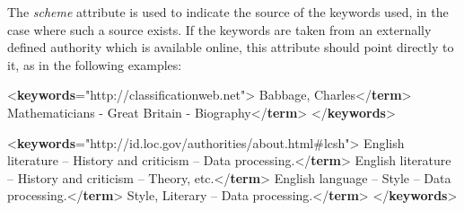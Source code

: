 The {\itshape scheme} attribute is used to indicate the source of the keywords used, in the case where such a source exists. If the keywords are taken from an externally defined authority which is available online, this attribute should point directly to it, as in the following examples: \par\bgroup{}\exampleFont \begin{shaded}\noindent\mbox{}{<\textbf{keywords}\hspace*{1em}{scheme}="{http://classificationweb.net}">}\mbox{}\newline 
{}Babbage, Charles{</\textbf{term}>}\mbox{}\newline 
{}Mathematicians - Great Britain - Biography{</\textbf{term}>}\mbox{}\newline 
{</\textbf{keywords}>}\end{shaded}\egroup\par \noindent  \par\bgroup{}\exampleFont \begin{shaded}\noindent\mbox{}{<\textbf{keywords}\hspace*{1em}{scheme}="{http://id.loc.gov/authorities/about.html\#lcsh}">}\mbox{}\newline 
{}English literature -- History and criticism -- Data processing.{</\textbf{term}>}\mbox{}\newline 
{}English literature -- History and criticism -- Theory, etc.{</\textbf{term}>}\mbox{}\newline 
{}English language -- Style -- Data processing.{</\textbf{term}>}\mbox{}\newline 
{}Style, Literary -- Data processing.{</\textbf{term}>}\mbox{}\newline 
{</\textbf{keywords}>}\end{shaded}\egroup\par \par
